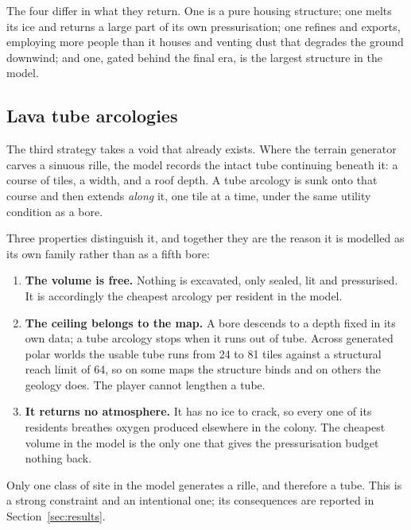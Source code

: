 The four differ in what they return. One is a pure housing structure; one
melts its ice and returns a large part of its own pressurisation; one refines
and exports, employing more people than it houses and venting dust that
degrades the ground downwind; and one, gated behind the final era, is the
largest structure in the model.

\subsection{Lava tube arcologies}

The third strategy takes a void that already exists. Where the terrain
generator carves a sinuous rille, the model records the intact tube continuing
beneath it: a course of tiles, a width, and a roof depth. A tube arcology is
sunk onto that course and then extends \emph{along} it, one tile at a time,
under the same utility condition as a bore.

Three properties distinguish it, and together they are the reason it is
modelled as its own family rather than as a fifth bore:

\begin{enumerate}
\item \textbf{The volume is free.} Nothing is excavated, only sealed, lit and
  pressurised. It is accordingly the cheapest arcology per resident in the
  model.
\item \textbf{The ceiling belongs to the map.} A bore descends to a depth fixed
  in its own data; a tube arcology stops when it runs out of tube. Across
  generated polar worlds the usable tube runs from 24 to 81 tiles against a
  structural reach limit of 64, so on some maps the structure binds and on
  others the geology does. The player cannot lengthen a tube.
\item \textbf{It returns no atmosphere.} It has no ice to crack, so every one
  of its residents breathes oxygen produced elsewhere in the colony. The
  cheapest volume in the model is the only one that gives the pressurisation
  budget nothing back.
\end{enumerate}

Only one class of site in the model generates a rille, and therefore a tube.
This is a strong constraint and an intentional one; its consequences are
reported in Section~\ref{sec:results}.
